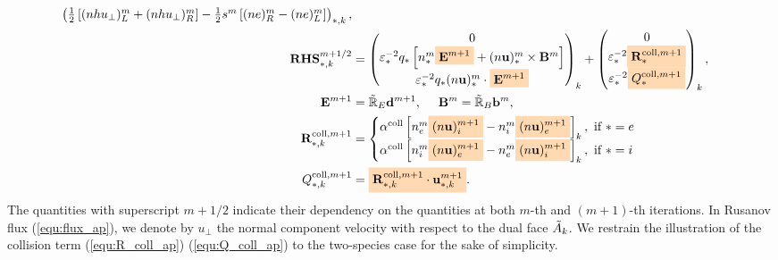 \documentclass{article}
\newcommand{\mycolorbox}[2]{\colorbox{#1}{$\displaystyle#2$}}
\begin{document}
\begin{subequations}
\begin{align}
\begin{pmatrix}
    \frac{1}{2}\left[(nhu_\bot)^m_{L} + (nhu_\bot)^m_{R}\right] - \frac{1}{2}s^m\left[(ne)^m_{R} - (ne)^m_{L}\right]
    \end{pmatrix}_{\ast,k}, \label{equ:flux_ap}\\
    \mathbf{RHS}_{*,k}^{m+1/2} &=
    \begin{pmatrix}
    0 \\
    \varepsilon_*^{-2}q_*\left[n_*^m\mycolorbox{orange!30}{\mathbf{E}^{m+1}} + (n\mathbf{u})^m_*\times\mathbf{B}^m\right] \\
    \varepsilon_*^{-2}q_*(n\mathbf{u})^m_* \cdot \mycolorbox{orange!30}{\mathbf{E}^{m+1}}
    \end{pmatrix}_k +
    \begin{pmatrix}
    0 \\
    \varepsilon_*^{-2}\mycolorbox{orange!30}{\mathbf{R}_{*}^{\text{coll},m+1}} \\
    \varepsilon_*^{-2}\mycolorbox{orange!30}{Q_*^{\text{coll}, m+1}} 
    \end{pmatrix}_k, \label{equ:rhs_ap}\\
    \mathbf{E}^{m+1} &= \Tilde{\mathbb{R}}_E\mathbf{d}^{m+1},
    \ \ \ \ 
    \mathbf{B}^{m} = \Tilde{\mathbb{R}}_B\mathbf{b}^{m}, \\
    \mathbf{R}_{*,k}^{\text{coll},m+1} &= 
    \begin{cases}
    \alpha^\text{coll}\left[n_{e}^m\mycolorbox{orange!30}{(n\mathbf{u})^{m+1}_{i}} - n_{i}^m\mycolorbox{orange!30}{(n\mathbf{u})^{m+1}_{e}}\right]_k, \text{   if   } * = e \\
    \alpha^\text{coll}\left[n_{i}^m\mycolorbox{orange!30}{(n\mathbf{u})^{m+1}_{e}} - n_{e}^m\mycolorbox{orange!30}{(n\mathbf{u})^{m+1}_{i}}\right]_k, \text{   if   } * = i
    \end{cases}  \label{equ:R_coll_ap}\\
    Q_{*,k}^{\text{coll},m+1} &= \mycolorbox{orange!30}{\mathbf{R}_{*,k}^{\text{coll},m+1} \cdot \mathbf{u}_{\ast,k}^{m+1}} \label{equ:Q_coll_ap}
.\end{align}
\end{subequations}
The quantities with superscript $m+1/2$ indicate their dependency on the quantities at both $m$-th and $(m+1)$-th iterations. In Rusanov flux (\ref{equ:flux_ap}), we denote by $u_\perp$ the normal component velocity with respect to the dual face $\Tilde{A}_k$. We restrain the illustration of the collision term (\ref{equ:R_coll_ap}) (\ref{equ:Q_coll_ap}) to the two-species case for the sake of simplicity. 
\end{document}
